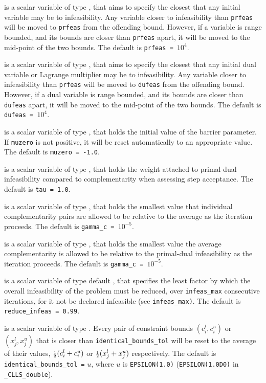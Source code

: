 \documentclass{galahad}
\newcommand{\packagename}{CLLS}
\newcommand{\fullpackagename}{\libraryname\_\packagename}
\begin{document}
\begin{description}
 is a scalar variable of type \realdp, that aims to specify
the closest that any initial variable may be to infeasibility. Any variable
closer to infeasibility than {\tt prfeas} will be moved to {\tt prfeas} from
the offending bound. However, if a variable is range bounded, and its bounds
are closer than {\tt prfeas} apart, it will be moved to the mid-point of the
two bounds.
The default is {\tt prfeas = $10^4$}.

 is a scalar variable of type \realdp, that aims to specify
the closest that any initial dual variable or Lagrange multiplier may be to
infeasibility. Any variable closer to infeasibility than {\tt prfeas} will be
moved to {\tt dufeas} from the offending bound. However, if a dual variable
is range bounded, and its bounds are closer than {\tt dufeas} apart, it will
be moved to the mid-point of the two bounds.
The default is {\tt dufeas = $10^4$}.

  is a scalar variable of type \realdp, that holds the
initial value of the barrier parameter. If {\tt muzero} is
not positive, it will be reset automatically to an appropriate value.
The default is {\tt muzero = -1.0}.

  is a scalar variable of type \realdp, that holds the
weight attached to primal-dual infeasibility compared to complementarity
when assessing step acceptance.
The default is {\tt tau = 1.0}.

  is a scalar variable of type \realdp, that holds the
smallest value that individual complementarity pairs are allowed
to be relative to the average as the iteration proceeds.
The default is {\tt gamma\_c = $10^{-5}$}.

  is a scalar variable of type \realdp, that holds the
smallest value the average complementarity is allowed
to be relative to the primal-dual infeasibility as the iteration proceeds.
The default is {\tt gamma\_c = $10^{-5}$}.

  is a scalar variable of type default
\realdp, that specifies the
least factor by which the overall infeasibility of the problem must be reduced,
over {\tt infeas\_max} consecutive iterations,
for it not be declared infeasible (see {\tt infeas\_max)}.
The default is {\tt reduce\_infeas = 0.99}.

is a scalar variable of type \realdp.
Every pair of constraint bounds
$(c_{i}^{l}, c_{i}^{u})$ or $(x_{j}^{l}, x_{j}^{u})$
that is closer than {\tt identical\_bounds\_tol}
will be reset to the average of their values,
${\scriptstyle \frac{1}{2}} (c_{i}^{l} + c_{i}^{u})$ or ${\scriptstyle \frac{1}{2}} (x_{j}^{l} + x_{j}^{u})$
respectively.
The default is {\tt identical\_bounds\_tol =} $u$,
where $u$ is {\tt EPSILON(1.0)} ({\tt EPSILON(1.0D0)} in
{\tt \fullpackagename\_double}).


\end{description}
\end{document}
